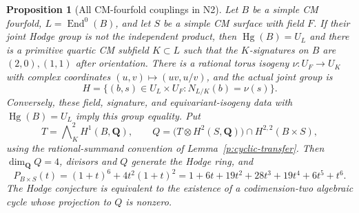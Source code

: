 \documentclass[11pt,reqno]{article}
\theoremstyle{emphasizedplain}
\newtheorem{proposition}[theorem]{Proposition}
\theoremstyle{emphasizeddefinition}
\theoremstyle{emphasizeddefinition}
\DeclareMathOperator{\End}{End}
\DeclareMathOperator{\Hg}{Hg}
\newcommand{\Q}{\mathbf Q}
\begin{document}
\begin{proposition}[All CM-fourfold couplings in N2]
\label{p:N2CMstructure}
Let $B$ be a simple CM fourfold, $L=\End^0(B)$, and let $S$ be
a simple CM surface with field $F$. If their joint Hodge group
is not the independent product, then $\Hg(B)=U_L$ and there is
a primitive quartic CM subfield $K\subset L$ such that the
$K$-signatures on $B$ are $(2,0),(1,1)$ after orientation.
There is a rational torus isogeny $\nu:U_F\to U_K$ with complex
coordinates $(u,v)\mapsto(uv,u/v)$, and the actual joint group is
\[
 H=\{(b,s)\in U_L\times U_F:N_{L/K}(b)=\nu(s)\}.
\]
Conversely, these field, signature, and equivariant-isogeny data
with $\Hg(B)=U_L$ imply this group equality. Put
\[
 T=\bigwedge\nolimits_K^2H^1(B,\Q),\qquad
 Q=\bigl(T\otimes H^2(S,\Q)\bigr)\cap H^{2,2}(B\times S),
\]
using the rational-summand convention of Lemma~\ref{p:cyclic-transfer}.
Then $\dim_\Q Q=4$, divisors and $Q$ generate the Hodge ring, and
\[
 P_{B\times S}(t)=(1+t)^6+4t^2(1+t)^2
 =1+6t+19t^2+28t^3+19t^4+6t^5+t^6.
\]
The Hodge conjecture is equivalent to the existence of a
codimension-two algebraic cycle whose projection to $Q$ is nonzero.
\end{proposition}
\end{document}
